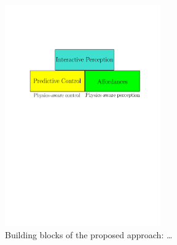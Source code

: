 \begin{figure}[h]
\centering
\includegraphics[width=0.6\textwidth]{images/blocks.pdf}
\caption{Building blocks of the proposed approach: \ldots}
\end{figure}

